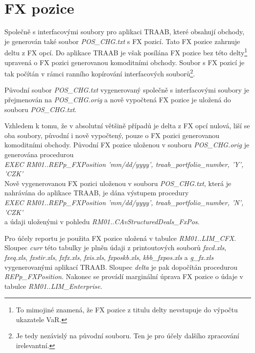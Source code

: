 \documentclass[a4paper]{book}
\begin{document}
\chapter{FX pozice}

Společně s interfacovými soubory pro aplikaci TRAAB, které obsahují obchody, je generován také soubor \textit{POS\_CHG.txt} s FX pozicí. Tato FX pozice zahrnuje deltu z FX opcí. Do aplikace TRAAB je však posílána FX pozice bez této delty\footnote{To mimojiné znamená, že FX pozice z titulu delty nevstupuje do výpočtu ukazatele VaR.} upravená o FX pozici generovanou komoditními obchody. Soubor s FX pozicí je tak počítán v rámci ranního kopírování interfacových souborů\footnote{Je tedy nezávislý na původní souboru. Ten je pro účely dalšího zpracování irelevantní.}.

Původní soubor \textit{POS\_CHG.txt} vygenerovaný společně s interfacovými soubory je přejmenován na \textit{POS\_CHG.orig} a nově vypočtená FX pozice je uložená do souboru \textit{POS\_CHG.txt}.

Vzhledem k tomu, že v absolutní většině případů je delta z FX opcí nulová, liší se oba soubory, původní i nově vypočtený, pouze o FX pozici generovanou komoditními obchody. Původní FX pozice uloženou v souboru \textit{POS\_CHG.orig} je generována procedurou\\

\textit{EXEC RM01..REPp\_FXPosition 'mm/dd/yyyy', traab\_portfolio\_number, 'Y', 'CZK'}\\

Nově vygenerovanou FX pozici uloženou v souboru \textit{POS\_CHG.txt}, která je nahrávána do aplikace TRAAB, je dána výstupem procedury\\


\textit{EXEC RM01..REPp\_FXPosition 'mm/dd/yyyy', traab\_portfolio\_number, 'N', 'CZK'}\\

a údaji uloženými v pohledu \textit{RM01..CAvStructuredDeals\_FxPos}.

Pro účely reportu je použita FX pozice uložená v tabulce \textit{RM01..LIM\_CFX}. Sloupec \textit{curr} této tabulky je plněn údaji z printoutových souborů \textit{fxcd.xls}, \textit{fxeq.xls}, \textit{fxstir.xls}, \textit{fxfx.xls}, \textit{fxis.xls}, \textit{fxposkb.xls}, \textit{kbb\_fxpos.xls} a \textit{g\_fx.xls} vygenerovanými aplikací TRAAB. Sloupec \textit{delta} je pak dopočítán procedurou \textit{REPp\_FXPosition}. Nakonec se provádí marginální úprava FX pozice o údaje v tabulce \textit{RM01..LIM\_Enterprise}.
\end{document}
